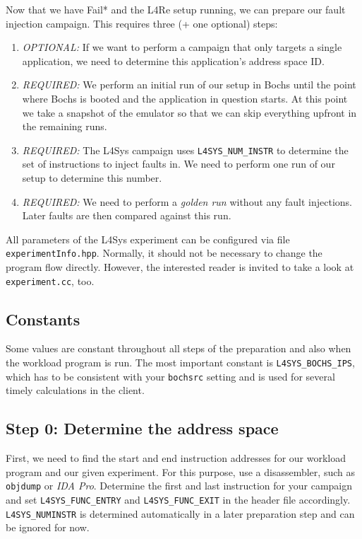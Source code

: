 \documentclass[a4paper,times,9pt]{article}
\newcommand{\lfs}{L4Sys}
\begin{document}
Now that we have Fail* and the L4Re setup running, we can prepare our fault
injection campaign. This requires three (+ one optional) steps:
\begin{enumerate}[topsep=0em,itemsep=0em]
  \item \emph{OPTIONAL:} If we want to perform a campaign that only targets
        a single application, we need to determine this application's address
        space ID.
  \item \emph{REQUIRED:} We perform an initial run of our setup in Bochs until
        the point where Bochs is booted and the application in question
        starts. At this point we take a snapshot of the emulator so that we
        can skip everything upfront in the remaining runs.
  \item \emph{REQUIRED:} The \lfs{} campaign uses \verb+L4SYS_NUM_INSTR+ to
        determine the set of instructions to inject faults in. We need to
        perform one run of our setup to determine this number.
  \item \emph{REQUIRED:} We need to perform a \emph{golden run} without any
        fault injections. Later faults are then compared against this run.
\end{enumerate}

All parameters of the \lfs{} experiment can be configured via file
\texttt{experimentInfo.hpp}. Normally, it should not be necessary to change
the program flow directly. However, the interested reader is invited to take a
look at \texttt{experiment.cc}, too.

\subsection{Constants}

Some values are constant throughout all steps of the preparation and also when
the workload program is run.  The most important constant is
\verb+L4SYS_BOCHS_IPS+, which has to be consistent with your \texttt{bochsrc}
setting and is used for several timely calculations in the client.

\subsection{Step 0: Determine the address space}

First, we need to find the start and end instruction addresses for our
workload program and our given experiment. For this purpose, use a
disassembler, such as \texttt{objdump} or \emph{IDA Pro}. Determine the first
and last instruction for your campaign and set  \verb+L4SYS_FUNC_ENTRY+ and
\verb+L4SYS_FUNC_EXIT+ in the header file accordingly. \verb+L4SYS_NUMINSTR+
is determined automatically in a later preparation step and can be ignored for
now.
\end{document}

